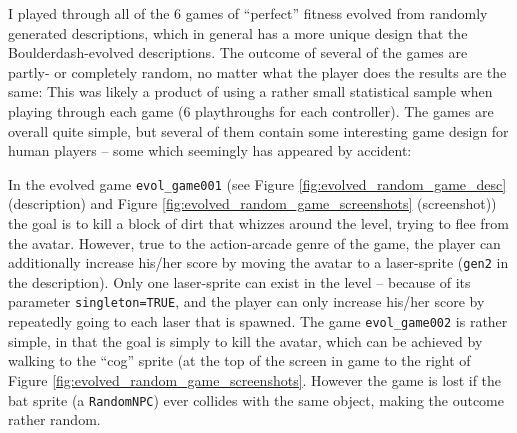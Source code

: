\documentclass[a4paper,titlepage,final]{report}
\begin{document}
I played through all of the 6 games of ``perfect'' fitness evolved from randomly generated descriptions, which in general has a more unique design that the Boulderdash-evolved descriptions.
The outcome of several of the games are partly- or completely random, no matter what the player does the results are the same: 
This was likely a product of using a rather small statistical sample when playing through each game (6 playthroughs for each controller).
The games are overall quite simple, but several of them contain some interesting game design for human players -- some which seemingly has appeared by accident:

In the evolved game  \texttt{evol_game001} (see Figure \ref{fig:evolved_random_game_desc} (description) and Figure \ref{fig:evolved_random_game_screenshots} (screenshot)) the goal is to kill a block of dirt that whizzes around the level, trying to flee from the avatar.
However, true to the action-arcade genre of the game, the player can additionally increase his/her score by moving the avatar to a laser-sprite (\texttt{gen2} in the description). 
Only one laser-sprite can exist in the level -- because of its parameter \texttt{singleton=TRUE}, and the player can only increase his/her score by repeatedly going to each laser that is spawned.
The game \texttt{evol_game002} is rather simple, in that the goal is simply to kill the avatar, which can be achieved by walking to the ``cog'' sprite (at the top of the screen in game to the right of Figure \ref{fig:evolved_random_game_screenshots}.
However the game is lost if the bat sprite (a \texttt{RandomNPC}) ever collides with the same object, making the outcome rather random.
\end{document}
